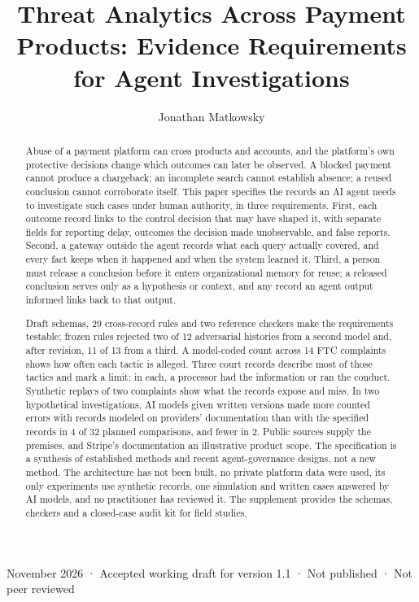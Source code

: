 \documentclass[acmlarge,nonacm]{acmart}
\begin{document}
\title{Threat Analytics Across Payment Products: Evidence Requirements
for Agent Investigations}
\author{Jonathan Matkowsky}
\begin{abstract}
Abuse of a payment platform can cross products and accounts, and the
platform's own protective decisions change which outcomes can later be
observed. A blocked payment cannot produce a chargeback; an incomplete
search cannot establish absence; a reused conclusion cannot corroborate
itself. This paper specifies the records an AI agent needs to
investigate such cases under human authority, in three requirements.
First, each outcome record links to the control decision that may have
shaped it, with separate fields for reporting delay, outcomes the
decision made unobservable, and false reports. Second, a gateway outside
the agent records what each query actually covered, and every fact keeps
when it happened and when the system learned it. Third, a person must
release a conclusion before it enters organizational memory for reuse; a
released conclusion serves only as a hypothesis or context, and any
record an agent output informed links back to that output.

Draft schemas, 29 cross-record rules and two reference checkers make the
requirements testable; frozen rules rejected two of 12 adversarial
histories from a second model and, after revision, 11 of 13 from a
third. A model-coded count across 14 FTC complaints shows how often each
tactic is alleged. Three court records describe most of those tactics
and mark a limit: in each, a processor had the information or ran the
conduct. Synthetic replays of two complaints show what the records
expose and miss. In two hypothetical investigations, AI models given
written versions made more counted errors with records modeled on
providers' documentation than with the specified records in 4 of 32
planned comparisons, and fewer in 2. Public sources supply the premises,
and Stripe's documentation an illustrative product scope. The
specification is a synthesis of established methods and recent
agent-governance designs, not a new method. The architecture has not
been built, no private platform data were used, its only experiments use
synthetic records, one simulation and written cases answered by AI
models, and no practitioner has reviewed it. The supplement provides the
schemas, checkers and a closed-case audit kit for field studies.
\end{abstract}
 November 2026 · Accepted working draft for version 1.1 · Not
published · Not peer reviewed
\end{document}
